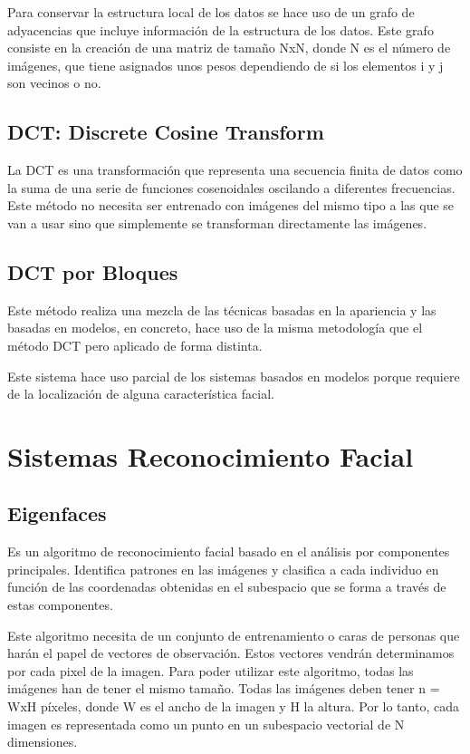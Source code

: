 \documentclass[a4paper,11pt]{book}
\begin{document}
Para conservar la estructura local de los datos se hace uso de un grafo de
adyacencias que incluye información de la estructura de los datos. Este grafo consiste en la creación de una matriz de tamaño NxN, donde N es el número de imágenes, que tiene asignados unos pesos dependiendo de si los elementos i y j son vecinos o no. 

\subsection{DCT: Discrete Cosine Transform}

La DCT es una transformación que representa una secuencia finita de datos
como la suma de una serie de funciones cosenoidales oscilando a diferentes
frecuencias. Este método no necesita ser entrenado con imágenes del
mismo tipo a las que se van a usar sino que simplemente se transforman
directamente las imágenes. 

\subsection{DCT por Bloques }

Este método realiza una mezcla de las técnicas basadas en la apariencia y las
basadas en modelos, en concreto, hace uso de la misma metodología que el
método DCT pero aplicado de forma distinta.  

Este sistema hace uso parcial de los sistemas basados en modelos porque
requiere de la localización de alguna característica facial.  

\section{Sistemas Reconocimiento Facial }

\subsection{ Eigenfaces}

Es un algoritmo\cite{turk}  de reconocimiento facial basado en el análisis por componentes principales. Identifica patrones en las imágenes y clasifica a cada individuo en función de las coordenadas obtenidas en el subespacio que se forma a través de estas componentes.

Este algoritmo necesita de un conjunto de entrenamiento o caras de personas
que harán el papel de vectores de observación. Estos vectores vendrán determinamos por cada pixel de la imagen.
Para poder utilizar este algoritmo, todas las imágenes han de tener el mismo tamaño. Todas las imágenes deben tener n = WxH píxeles, donde W es el ancho de la imagen y H la altura. Por lo tanto, cada imagen es representada como un punto en un subespacio vectorial de N dimensiones.
\end{document}
